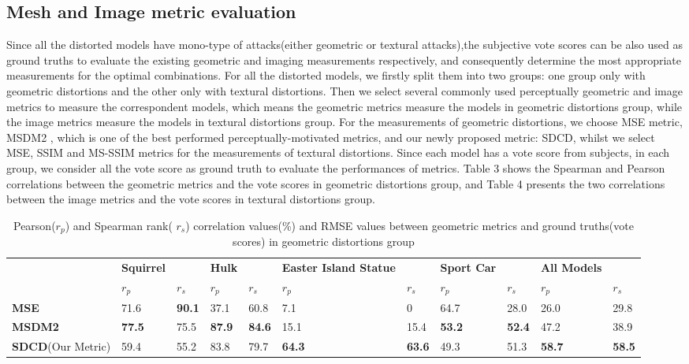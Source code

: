 \subsection{Mesh and  Image metric evaluation}
Since all the distorted models have mono-type of attacks(either geometric or textural attacks),the subjective vote scores can be also used as ground truths to evaluate the existing geometric and imaging measurements respectively, and consequently determine the most appropriate measurements for the optimal combinations. For all the distorted models, we firstly split them into two groups: one group only with geometric distortions and the other only with textural distortions. Then we select several commonly used perceptually geometric and image metrics to measure the correspondent models, which means the geometric metrics measure the models in geometric distortions group, while the image metrics measure the models in textural distortions group. For the measurements of geometric distortions, we choose MSE metric, MSDM2 \cite{Lavou__2011}, which is one of the best performed perceptually-motivated metrics, and our newly proposed metric: SDCD, whilst we select MSE, SSIM \cite{Wang_2004} and MS-SSIM \cite{Wang} metrics for the measurements of textural distortions.  Since each model has a vote score from subjects, in each group, we consider all the vote score as ground truth to evaluate the performances of metrics.  Table 3 shows the Spearman and Pearson correlations between the geometric metrics and the vote scores in geometric distortions group, and Table 4 presents the two correlations between the image metrics and the vote scores in textural distortions group.\\
\begin{table}[]
\centering
\caption{Pearson($r_p$) and Spearman rank( $r_s$) correlation values(\%) and RMSE values between geometric metrics and ground truths(vote scores) in geometric distortions group}
\label{my-label}
\begin{tabular}{lllllllllll}
                          &  \textbf{Squirrel} & \textbf{} & \textbf{Hulk} & \textbf{} & \textbf{Easter Island Statue} & \textbf{} & \textbf{Sport Car} & \textbf{} & \textbf{All Models} &      \\
                          & $r_p$        & $r_s$        & $r_p$            & $r_s$        & $r_p$               & $r_s$        & $r_p$                & $r_s$       & $r_p$                  & $r_s$   \\
 \textbf{MSE}           & 71.6 & \textbf{90.1} & 37.1 & 60.8 & 7.1  &  0        & 64.7 & 28.0 & 26.0          & 29.8         \\
\textbf{MSDM2} \cite{Lavou__2011}            & \textbf{77.5} & 75.5 & \textbf{87.9} & \textbf{84.6} & 15.1                 & 15.4          & \textbf{53.2} & \textbf{52.4} & 47.2          & 38.9          \\
\textbf{SDCD}(Our Metric) & 59.4          & 55.2          & 83.8          & 79.7          & \textbf{64.3}        & \textbf{63.6} & 49.3          & 51.3          & \textbf{58.7} & \textbf{58.5}
\end{tabular}
\end{table}

